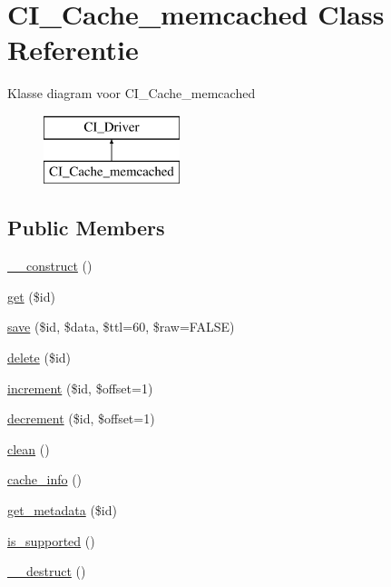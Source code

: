 \hypertarget{class_c_i___cache__memcached}{}\section{C\+I\+\_\+\+Cache\+\_\+memcached Class Referentie}
\label{class_c_i___cache__memcached}
Klasse diagram voor C\+I\+\_\+\+Cache\+\_\+memcached\begin{figure}[H]
\begin{center}
\leavevmode
\includegraphics[height=2.000000cm]{class_c_i___cache__memcached}
\end{center}
\end{figure}
\subsection*{Public Members}
\begin{DoxyCompactItemize}
\item 
\mbox{\hyperlink{class_c_i___cache__memcached_a095c5d389db211932136b53f25f39685}{\+\_\+\+\_\+construct}} ()
\item 
\mbox{\hyperlink{class_c_i___cache__memcached_a50e3bfb586b2f42932a6a93f3fbb0828}{get}} (\$id)
\item 
\mbox{\hyperlink{class_c_i___cache__memcached_a472645db04a8ce4b040b789a3062a7d2}{save}} (\$id, \$data, \$ttl=60, \$raw=F\+A\+L\+SE)
\item 
\mbox{\hyperlink{class_c_i___cache__memcached_a2f8258add505482d7f00ea26493a5723}{delete}} (\$id)
\item 
\mbox{\hyperlink{class_c_i___cache__memcached_a2f07a4e09b57f4460d49852497d1808f}{increment}} (\$id, \$offset=1)
\item 
\mbox{\hyperlink{class_c_i___cache__memcached_a4eb1c2772c8efc48c411ea060dd040b7}{decrement}} (\$id, \$offset=1)
\item 
\mbox{\hyperlink{class_c_i___cache__memcached_adb40b812890a8bc058bf6b7a0e1a54d9}{clean}} ()
\item 
\mbox{\hyperlink{class_c_i___cache__memcached_acb4742926a6fa901e4f0917e1a35ef4c}{cache\+\_\+info}} ()
\item 
\mbox{\hyperlink{class_c_i___cache__memcached_a59635cf18e997c5141bffa05ff7622e0}{get\+\_\+metadata}} (\$id)
\item 
\mbox{\hyperlink{class_c_i___cache__memcached_a98c68fd153468bc148c4ed8c716859fc}{is\+\_\+supported}} ()
\item 
\mbox{\hyperlink{class_c_i___cache__memcached_a421831a265621325e1fdd19aace0c758}{\+\_\+\+\_\+destruct}} ()
\end{DoxyCompactItemize}
